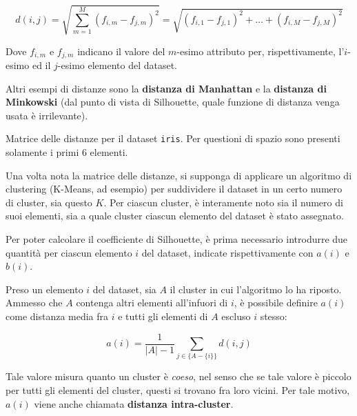 \documentclass[12pt]{report}
\begin{document}
			\begin{equation}
				d(i, j) =
				\sqrt{\sum_{m = 1}^{M} (f_{i, m} - f_{j, m})^{2}} =
				\sqrt{(f_{i, 1} - f_{j, 1})^{2} + \dots +
					(f_{i, M} - f_{j, M})^{2}}
			\end{equation}

			Dove $f_{i, m}$ e $f_{j, m}$ indicano il valore del $m$-esimo
			attributo per, rispettivamente, l'$i$-esimo ed il $j$-esimo
			elemento del dataset.

			Altri esempi di distanze sono la \textbf{distanza di Manhattan}
			e la \textbf{distanza di Minkowski} (dal punto di vista di
			Silhouette, quale funzione di distanza venga usata è irrilevante).

			\begin{table}[h]
				\centering
				\caption{Matrice delle distanze per il dataset \texttt{iris}. Per questioni
				di spazio sono presenti solamente i primi 6 elementi.}
				\label{tab:dist}
			\end{table}

			Una volta nota la matrice delle distanze, si supponga di applicare
			un algoritmo di clustering (K-Means, ad esempio) per suddividere il
			dataset in un certo numero di cluster, sia questo $K$. Per ciascun
			cluster, è interamente noto sia il numero di suoi elementi, sia
			a quale cluster ciascun elemento del dataset è stato assegnato.

			Per poter calcolare il coefficiente di Silhouette, è prima necessario
			introdurre due quantità per ciascun elemento $i$ del dataset, indicate
			rispettivamente con $a(i)$ e $b(i)$.

			Preso un elemento $i$ del dataset, sia $A$ il cluster in cui l'algoritmo
			lo ha riposto. Ammesso che $A$ contenga altri elementi all'infuori di $i$,
			è possibile definire $a(i)$ come distanza media fra $i$ e tutti gli elementi
			di $A$ escluso $i$ stesso:

			\begin{equation}
				a(i) = \frac{1}{|A| - 1} \sum_{j \in \{A - \{i\}\}} d(i, j)
			\end{equation}

			Tale valore misura quanto un cluster è \textit{coeso}, nel senso
			che se tale valore è piccolo per tutti gli elementi del cluster,
			questi si trovano fra loro vicini. Per tale motivo, $a(i)$ viene
			anche chiamata \textbf{distanza intra-cluster}.
\end{document}
